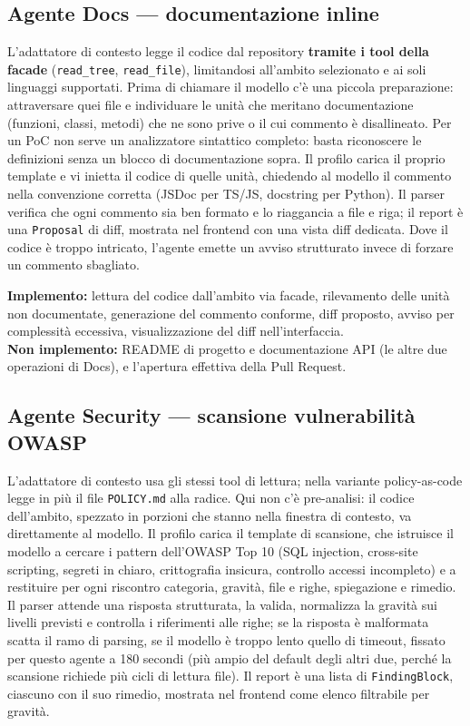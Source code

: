 \documentclass[11pt,a4paper]{article}
\begin{document}
\subsection{Agente Docs --- documentazione inline}

L'adattatore di contesto legge il codice dal repository \textbf{tramite i tool della facade} (\texttt{read\_tree}, \texttt{read\_file}), limitandosi all'ambito selezionato e ai soli linguaggi supportati. Prima di chiamare il modello c'è una piccola preparazione: attraversare quei file e individuare le unità che meritano documentazione (funzioni, classi, metodi) che ne sono prive o il cui commento è disallineato. Per un PoC non serve un analizzatore sintattico completo: basta riconoscere le definizioni senza un blocco di documentazione sopra. Il profilo carica il proprio template e vi inietta il codice di quelle unità, chiedendo al modello il commento nella convenzione corretta (JSDoc per TS/JS, docstring per Python). Il parser verifica che ogni commento sia ben formato e lo riaggancia a file e riga; il report è una \texttt{Proposal} di diff, mostrata nel frontend con una vista diff dedicata. Dove il codice è troppo intricato, l'agente emette un avviso strutturato invece di forzare un commento sbagliato.

\textbf{Implemento:} lettura del codice dall'ambito via facade, rilevamento delle unità non documentate, generazione del commento conforme, diff proposto, avviso per complessità eccessiva, visualizzazione del diff nell'interfaccia.\\
\textbf{Non implemento:} README di progetto e documentazione API (le altre due operazioni di Docs), e l'apertura effettiva della Pull Request.

\subsection{Agente Security --- scansione vulnerabilità OWASP}

L'adattatore di contesto usa gli stessi tool di lettura; nella variante policy-as-code legge in più il file \texttt{POLICY.md} alla radice. Qui non c'è pre-analisi: il codice dell'ambito, spezzato in porzioni che stanno nella finestra di contesto, va direttamente al modello. Il profilo carica il template di scansione, che istruisce il modello a cercare i pattern dell'OWASP Top 10 (SQL injection, cross-site scripting, segreti in chiaro, crittografia insicura, controllo accessi incompleto) e a restituire per ogni riscontro categoria, gravità, file e righe, spiegazione e rimedio. Il parser attende una risposta strutturata, la valida, normalizza la gravità sui livelli previsti e controlla i riferimenti alle righe; se la risposta è malformata scatta il ramo di parsing, se il modello è troppo lento quello di timeout, fissato per questo agente a 180 secondi (più ampio del default degli altri due, perché la scansione richiede più cicli di lettura file). Il report è una lista di \texttt{FindingBlock}, ciascuno con il suo rimedio, mostrata nel frontend come elenco filtrabile per gravità.
\end{document}
